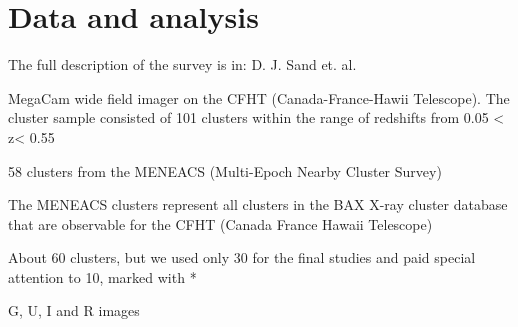 \chapter{Data and analysis}

The full description of the survey is in: D. J. Sand et. al. \citeyear{Reference11}

MegaCam wide field imager on the CFHT (Canada-France-Hawii Telescope). The cluster sample consisted of 101 clusters within the range of redshifts from 0.05 < z< 0.55

58 clusters from the MENEACS (Multi-Epoch Nearby Cluster Survey)

The MENEACS clusters represent all clusters in the BAX X-ray cluster database that are observable for the CFHT (Canada France Hawaii Telescope)

About 60 clusters, but we used only 30 for the final studies and paid special attention to 10, marked with *

G, U, I and R images

